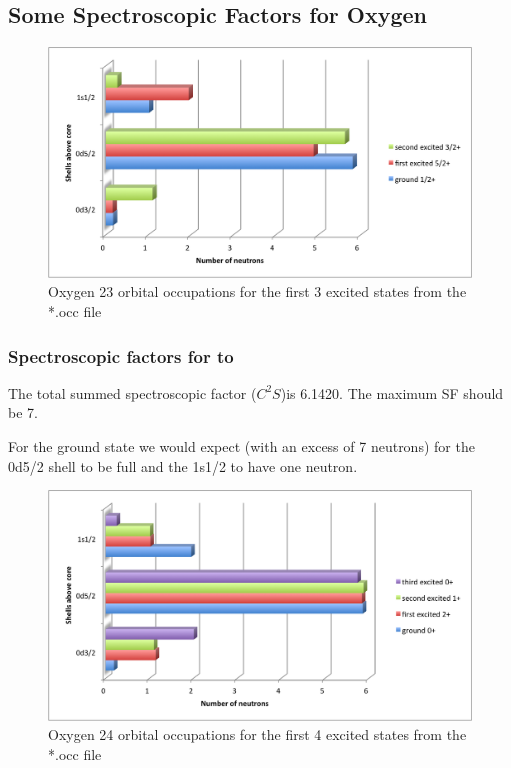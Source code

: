 \documentclass[12pt]{article}
\begin{document}
	\subsection{Some Spectroscopic Factors for Oxygen}
	\begin{figure}
\includegraphics[width=\textwidth]{o23specs.png}
\caption{Oxygen 23 orbital occupations for the first 3 excited states from the *.occ file}
\end{figure}
		
		\subsubsection{Spectroscopic factors for   to }

The total summed spectroscopic factor ($C^2S$)is 6.1420. The maximum SF should be 7. 

For the ground state we would expect (with an excess of 7 neutrons) for the 0d5/2 shell to be full and the 1s1/2 to have one neutron. 


		\begin{figure}
\includegraphics[width=\textwidth]{o24specs.png}
\caption{Oxygen 24 orbital occupations for the first 4 excited states from the *.occ file}
\end{figure}
\end{document}
